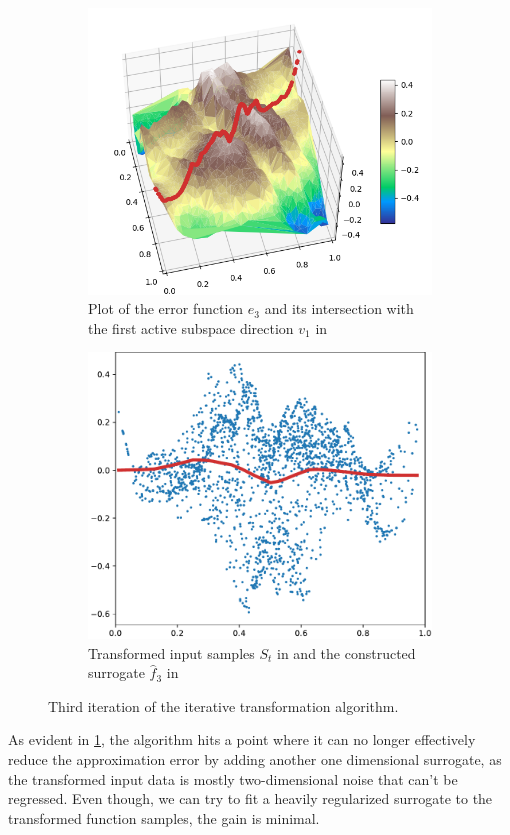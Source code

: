 \documentclass[
  a4paper,  %
  twoside,  %
  bibliography=totoc,
  headsepline,
  cleardoublepage=empty,
  parskip=half,
  draft=false
]{scrbook}
\begin{document}
\begin{mdframed}[style=style]
\begin{figure}[H]
\begin{subfigure}{.5\textwidth}
  \centering
  \includegraphics[width=.85\linewidth]{graphics/pipeline_current_3.png}
  \caption{Plot of the error function $e_3$ and its intersection with the first active subspace direction $v_1$ in \reddot}
\end{subfigure}%
\begin{subfigure}{.5\textwidth}
  \centering
  \includegraphics[width=.85\linewidth]{graphics/pipeline_local_3}
  \caption{Transformed input samples $S_t$ in \darkblue and the constructed surrogate $\hat{f}_3$ in \reddot}
\end{subfigure}
\delimit
\caption{Third iteration of the iterative transformation algorithm.}
\label{fig:pipeline_3}
\end{figure}
\end{mdframed}
%
As evident in \cref{fig:pipeline_3}, the algorithm hits a point where it can no longer effectively reduce the approximation error by adding another one dimensional surrogate, as the transformed input data is mostly two-dimensional noise that can't be regressed.
Even though, we can try to fit a heavily regularized surrogate to the transformed function samples, the gain is minimal.
\end{document}
